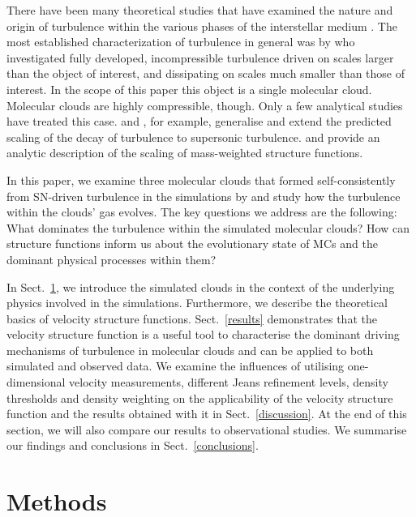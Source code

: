 \documentclass{aa}		%
\begin{document}
There have been many theoretical studies that have examined the nature and origin of turbulence within the various phases of the interstellar medium \citep[ISM;][and references within]{MacLow2004}. 
The most established characterization of turbulence in general was by \citet{Kolmogorov1941} who investigated fully developed, incompressible turbulence driven on scales larger than the object of interest, and dissipating on scales much smaller than those of interest.
In the scope of this paper this object is a single molecular cloud. 
Molecular clouds are highly compressible, though.
Only a few analytical studies have treated this case.
\citet{She1994} and \citet{Boldyrev2002}, for example, generalise and extend the predicted scaling of the decay of turbulence to supersonic turbulence.
\citet{Galtier2011} and \citet{Banerjee2013} provide an analytic description of the scaling of mass-weighted structure functions.

In this paper, we examine three molecular clouds that formed self-consistently from SN-driven turbulence in the simulations by \citet[ and \linebreak {} hereafter]{IbanezMejia2016,IbanezMejia2017} and study how the turbulence within the clouds' gas evolves.
The key questions we address are the following: 
What dominates the turbulence within the simulated molecular clouds? 
How can structure functions inform us about the evolutionary state of MCs and the dominant physical processes within them?

In Sect.~\ref{methods}, we introduce the simulated clouds in the context of the underlying physics involved in the simulations.
Furthermore, we describe the theoretical basics of velocity structure functions.
Sect.~\ref{results} demonstrates that the velocity structure function is a useful tool to characterise the dominant driving mechanisms of turbulence in molecular clouds and can be applied to both simulated and observed data. 
We examine the influences of utilising one-dimensional velocity measurements, different Jeans refinement levels, density thresholds and density weighting on the applicability of the velocity structure function and the results obtained with it in Sect.~\ref{discussion}.  
At the end of this section, we will also compare our results to observational studies.
We summarise our findings and conclusions in Sect.~\ref{conclusions}.


\section{Methods}\label{methods}
\end{document}
